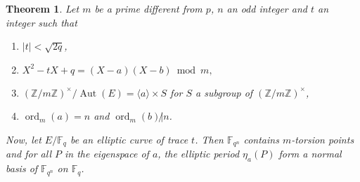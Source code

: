 \documentclass[12pt]{article}
\theoremstyle{plain}
\newtheorem{theorem}{Theorem}
\theoremstyle{definition}
\DeclareMathOperator{\order}{ord} %
\DeclareMathOperator{\Aut}{Aut}
\def\Z{\ensuremath{\mathbb{Z}}}
\def\F{\ensuremath{\mathbb{F}}}
\begin{document}
\begin{theorem}
\label{theorem:ellperiods}
Let $m$ be a prime different from $p$, $n$ an odd integer and $t$ an integer 
such that 

\begin{enumerate}
    \item $\mid t\mid < \sqrt{2q}$,
    \item $X^2 - tX + q = (X - a)(X - b)\bmod m,$
    \item $(\Z/m\Z)^{\times}/\Aut(E) = \langle{a}\rangle \times S$ for $S$ a subgroup of
$(\Z/m\Z)^{\times}$,
    \item $\order_m(a) = n$ and $\order_m(b)\not|n$.
\end{enumerate}
Now, let $E/\F_q$ be an elliptic curve of trace $t$. Then $\F_{q^n}$ contains 
$m$-torsion points and for all $P$ in the eigenspace of $a$, the elliptic 
period $\eta_a(P)$ form a normal basis of $\F_{q^n}$ on $\F_q$.

\end{theorem}
\end{document}
